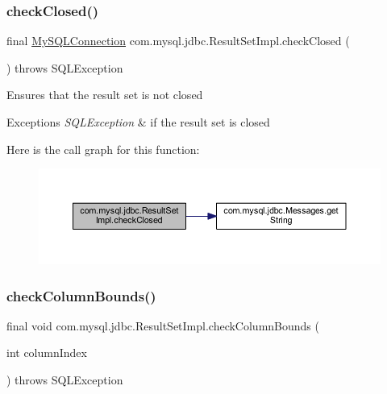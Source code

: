 \subsubsection{\texorpdfstring{check\+Closed()}{checkClosed()}}
{\footnotesize\ttfamily final \mbox{\hyperlink{interfacecom_1_1mysql_1_1jdbc_1_1_my_s_q_l_connection}{My\+S\+Q\+L\+Connection}} com.\+mysql.\+jdbc.\+Result\+Set\+Impl.\+check\+Closed (\begin{DoxyParamCaption}{ }\end{DoxyParamCaption}) throws S\+Q\+L\+Exception\hspace{0.3cm}{\ttfamily [protected]}}

Ensures that the result set is not closed


\begin{DoxyExceptions}{Exceptions}
{\em S\+Q\+L\+Exception} & if the result set is closed \\
\hline
\end{DoxyExceptions}
Here is the call graph for this function\+:
\nopagebreak
\begin{figure}[H]
\begin{center}
\leavevmode
\includegraphics[width=350pt]{classcom_1_1mysql_1_1jdbc_1_1_result_set_impl_a451fa419a4cdd5a02efd996428fcd0c4_cgraph}
\end{center}
\end{figure}
\mbox{\label{classcom_1_1mysql_1_1jdbc_1_1_result_set_impl_a1ef4220e1860ea8f9ab89180466c2bde}} 
\subsubsection{\texorpdfstring{check\+Column\+Bounds()}{checkColumnBounds()}}
{\footnotesize\ttfamily final void com.\+mysql.\+jdbc.\+Result\+Set\+Impl.\+check\+Column\+Bounds (\begin{DoxyParamCaption}\item[{int}]{column\+Index }\end{DoxyParamCaption}) throws S\+Q\+L\+Exception\hspace{0.3cm}{\ttfamily [protected]}}

